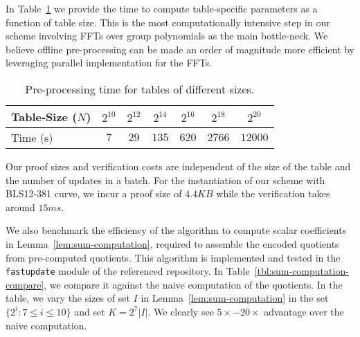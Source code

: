 \smallskip

 In Table~\ref{tbl:offline-proving-time} we provide the time to compute
table-specific parameters as a function of table size. This is the most computationally intensive step in our
scheme involving FFTs over group polynomials as the main bottle-neck. We believe offline pre-processing can be
made an order of magnitude more efficient by leveraging parallel implementation for the FFTs.

\begin{table}[htbp]
	\centering
    \begin{tabular}{|l|c|c|c|c|c|c|}
        \hline
        \cellcolor{lightgray} Table-Size ($N$) & $2^{10}$ & $2^{12}$ & $2^{14}$ & $2^{16}$ & $2^{18}$ & $2^{20}$ \\ \hline
        \cellcolor{lightgray} Time (s) & $7$ & $29$ & $135$ & $620$ & $2766$ & $12000$ \\ \hline
    \end{tabular}
    \caption{Pre-processing time for tables of different sizes.}
    \label{tbl:offline-proving-time}
\end{table}


 Our proof sizes and verification costs are independent of the
size of the table and the number of updates in a batch. For the instantiation of our scheme with BLS12-381 curve,
we incur a proof size of $4.4KB$ while the verification takes around $15ms$.

\smallskip

 We also benchmark the efficiency of the algorithm to compute
 scalar coefficients in Lemma~\ref{lem:sum-computation}, required to assemble the encoded quotients from pre-computed quotients.
This algorithm is implemented and tested in the {\tt fastupdate} module of the referenced repository.
In Table~\ref{tbl:sum-computation-compare}, we compare it against the naive computation of the quotients.
In the table, we vary the sizes of set $I$ in Lemma~\ref{lem:sum-computation} in the set $\{2^i:7\leq i\leq 10\}$
and set $K=2^7|I|$. %
We clearly see $5\times-20\times$ advantage over the naive computation.

\smallskip

